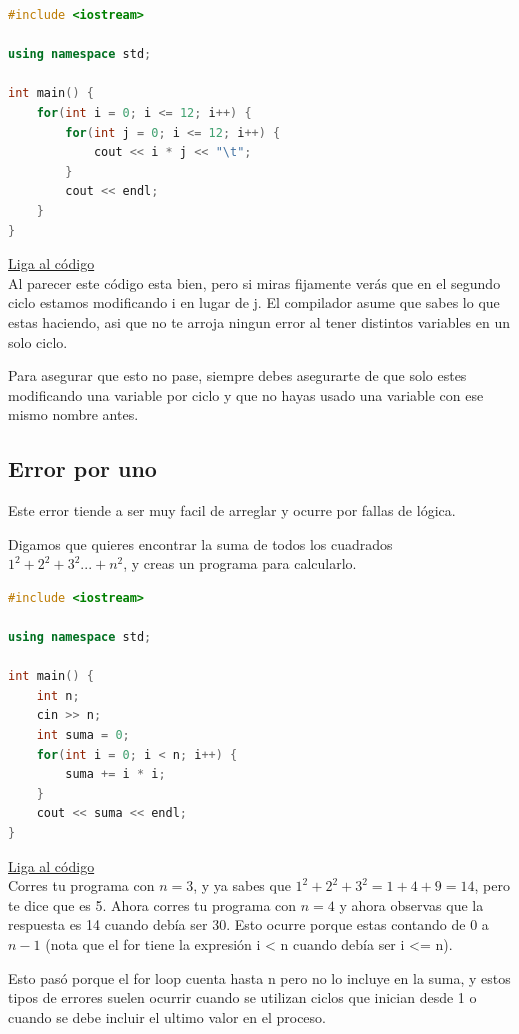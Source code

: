 \documentclass{article}
\begin{document}
\begin{lstlisting}[language=C++, caption=Ciclos con otras variables]
#include <iostream>

using namespace std;

int main() {
    for(int i = 0; i <= 12; i++) {
        for(int j = 0; i <= 12; i++) {
            cout << i * j << "\t";
        }
        cout << endl;
    }
}
\end{lstlisting}
\href{https://repl.it/@Jamesscn/Tablas-de-Falsedad}{Liga al código}\\

Al parecer este código esta bien, pero si miras fijamente verás que en el segundo ciclo estamos modificando i en lugar de j. El compilador asume que sabes lo que estas haciendo, asi que no te arroja ningun error al tener distintos variables en un solo ciclo.

Para asegurar que esto no pase, siempre debes asegurarte de que solo estes modificando una variable por ciclo y que no hayas usado una variable con ese mismo nombre antes.

\subsection{Error por uno}
Este error tiende a ser muy facil de arreglar y ocurre por fallas de lógica.

Digamos que quieres encontrar la suma de todos los cuadrados $1^2 + 2^2 + 3^2 ... + n^2$, y creas un programa para calcularlo.

\begin{lstlisting}[language=C++, caption=Error por uno]
#include <iostream>

using namespace std;

int main() {
    int n;
    cin >> n;
    int suma = 0;
    for(int i = 0; i < n; i++) {
        suma += i * i;
    }
    cout << suma << endl;
}
\end{lstlisting}
\href{https://repl.it/@Jamesscn/Sumás-Cuadrados}{Liga al código}\\

Corres tu programa con $n = 3$, y ya sabes que $1^2 + 2^2 + 3^2 = 1 + 4 + 9 = 14$, pero te dice que es 5. Ahora corres tu programa con $n = 4$ y ahora observas que la respuesta es 14 cuando debía ser 30. Esto ocurre porque estas contando de $0$ a $n-1$ (nota que el for tiene la expresión i < n cuando debía ser i <= n).

Esto pasó porque el for loop cuenta hasta n pero no lo incluye en la suma, y estos tipos de errores suelen ocurrir cuando se utilizan ciclos que inician desde 1 o cuando se debe incluir el ultimo valor en el proceso.
\end{document}
